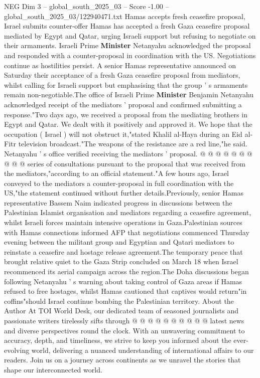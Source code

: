 \begin{textsample}{NEG Dim 3 – global\_south\_2025\_03 – Score -1.00 – global\_south\_2025\_03/122940471.txt}  \label{ex:f3_neg_423}
Hamas accepts fresh ceasefire proposal, Israel submits counter-offer Hamas has accepted a fresh Gaza ceasefire proposal mediated by Egypt and Qatar, urging Israeli support but refusing to negotiate on their armaments.
Israeli Prime \textbf{Minister} Netanyahu acknowledged the proposal and responded with a counter-proposal in coordination with the US.
Negotiations continue as hostilities persist.
A senior Hamas representative announced on Saturday their acceptance of a fresh Gaza ceasefire proposal from mediators, whilst calling for Israeli support but emphasising that the group ' s armaments remain non-negotiable.The office of Israeli Prime \textbf{Minister} Benjamin Netanyahu acknowledged receipt of the mediators ' proposal and confirmed submitting a response."Two days ago, we received a proposal from the mediating brothers in Egypt and Qatar.
We dealt with it positively and approved it.
We hope that the occupation ( Israel ) will not obstruct it,"stated Khalil al-Haya during an Eid al-Fitr television broadcast."The weapons of the resistance are a red line,"he said.
Netanyahu ' s office verified receiving the mediators ' proposal. @ @ @ @ @ @ @ @ @ @ series of consultations pursuant to the proposal that was received from the mediators,"according to an official statement."A few hours ago, Israel conveyed to the mediators a counter-proposal in full coordination with the US,"the statement continued without further details.Previously, senior Hamas representative Bassem Naim indicated progress in discussions between the Palestinian Islamist organisation and mediators regarding a ceasefire agreement, whilst Israeli forces maintain intensive operations in Gaza.Palestinian sources with Hamas connections informed AFP that negotiations commenced Thursday evening between the militant group and Egyptian and Qatari mediators to reinstate a ceasefire and hostage release agreement.The temporary peace that brought relative quiet to the Gaza Strip concluded on March 18 when Israel recommenced its aerial campaign across the region.The Doha discussions began following Netanyahu ' s warning about taking control of Gaza areas if Hamas refused to free hostages, whilst Hamas cautioned that captives would return"in coffins"should Israel continue bombing the Palestinian territory.
About the Author At TOI World Desk, our dedicated team of seasoned journalists and passionate writers tirelessly sifts through @ @ @ @ @ @ @ @ @ @ latest news and diverse perspectives round the clock.
With an unwavering commitment to accuracy, depth, and timeliness, we strive to keep you informed about the ever-evolving world, delivering a nuanced understanding of international affairs to our readers.
Join us on a journey across continents as we unravel the stories that shape our interconnected world.

\end{textsample}
